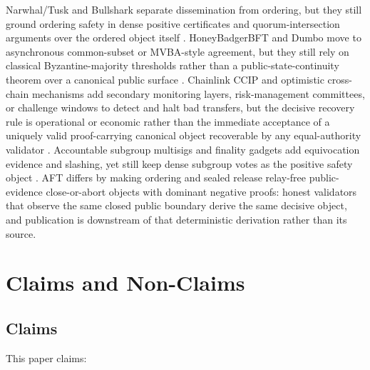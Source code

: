 \documentclass[11pt]{article}
\newcommand{\AFT}{\textsc{AFT}}
\begin{document}
Narwhal/Tusk and Bullshark separate dissemination from ordering, but they still
ground ordering safety in dense positive certificates and quorum-intersection
arguments over the ordered object itself \cite{narwhal,bullshark}. HoneyBadgerBFT
and Dumbo move to asynchronous common-subset or MVBA-style agreement, but they
still rely on classical Byzantine-majority thresholds rather than a
public-state-continuity theorem over a canonical public surface
\cite{honeybadger,dumbo}. Chainlink CCIP and optimistic cross-chain mechanisms
add secondary monitoring layers, risk-management committees, or challenge
windows to detect and halt bad transfers, but the decisive recovery rule is
operational or economic rather than the immediate acceptance of a uniquely valid
proof-carrying canonical object recoverable by any equal-authority validator
\cite{ccip}. Accountable subgroup multisigs and finality gadgets add
equivocation evidence and slashing, yet still keep dense subgroup votes as the
positive safety object \cite{grandpa,accountable}. \AFT{} differs by making
ordering and sealed release relay-free public-evidence close-or-abort objects
with dominant negative proofs: honest validators that observe the same closed
public boundary derive the same decisive object, and publication is downstream
of that deterministic derivation rather than its source.

\section{Claims and Non-Claims}

\subsection{Claims}

This paper claims:
\end{document}
